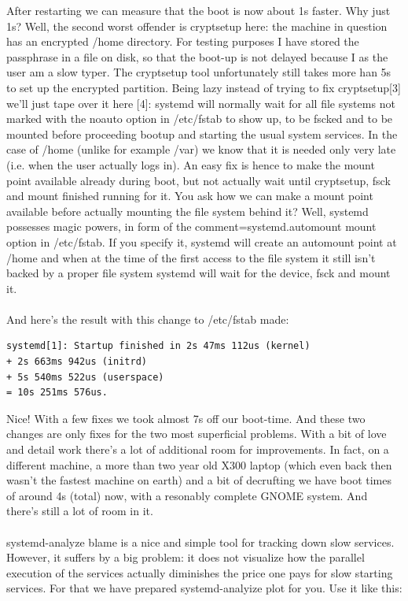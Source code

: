 \documentclass[titlepage]{article}
\begin{document}
After restarting we can measure that the boot is now about 1s faster. Why just 1s? Well, the second worst offender is cryptsetup here: the machine in question has an encrypted /home directory. For testing purposes I have stored the passphrase in a file on disk, so that the boot-up is not delayed because I as the user am a slow typer. The cryptsetup tool unfortunately still takes more han 5s to set up the encrypted partition. Being lazy instead of trying to fix cryptsetup[3] we'll just tape over it here [4]: systemd will normally wait for all file systems not marked with the noauto option in /etc/fstab to show up, to be fscked and to be mounted before proceeding bootup and starting the usual system services. In the case of /home (unlike for example /var) we know that it is needed only very late (i.e. when the user actually logs in). An easy fix is hence to make the mount point available already during boot, but not actually wait until cryptsetup, fsck and mount finished running for it. You ask how we can make a mount point available before actually mounting the file system behind it? Well, systemd possesses magic powers, in form of the comment=systemd.automount mount option in /etc/fstab. If you specify it, systemd will create an automount point at /home and when at the time of the first access to the file system it still isn't backed by a proper file system systemd will wait for the device, fsck and mount it.
\\
\\
And here's the result with this change to /etc/fstab made:
\begin{lstlisting}
systemd[1]: Startup finished in 2s 47ms 112us (kernel) 
+ 2s 663ms 942us (initrd) 
+ 5s 540ms 522us (userspace) 
= 10s 251ms 576us.
\end{lstlisting}
Nice! With a few fixes we took almost 7s off our boot-time. And these two changes are only fixes for the two most superficial problems. With a bit of love and detail work there's a lot of additional room for improvements. In fact, on a different machine, a more than two year old X300 laptop (which even back then wasn't the fastest machine on earth) and a bit of decrufting we have boot times of around 4s (total) now, with a resonably complete GNOME system. And there's still a lot of room in it.
\\
\\
systemd-analyze blame is a nice and simple tool for tracking down slow services. However, it suffers by a big problem: it does not visualize how the parallel execution of the services actually diminishes the price one pays for slow starting services. For that we have prepared systemd-analyize plot for you. Use it like this:
\end{document}
